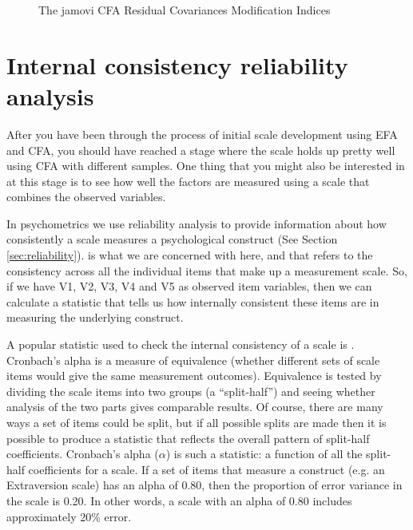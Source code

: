 \begin{figure}[p]
\begin{center}
\caption{The jamovi CFA Residual Covariances Modification Indices}
\label{fig:MTMM9}
\HR
\end{center}
\end{figure}


\section{Internal consistency reliability analysis~\label{sec:rel}}

After you have been through the process of initial scale development using EFA and CFA, you should have reached a stage where the scale holds up pretty well using CFA with different samples. One thing that you might also be interested in at this stage is to see how well the factors are measured using a scale that combines the observed variables. 

In psychometrics we use reliability analysis to provide information about how consistently a scale measures a psychological construct (See Section \ref{sec:reliability}).  is what we are concerned with here, and that refers to the consistency across all the individual items that make up a measurement scale. So, if we have V1, V2, V3, V4 and V5 as observed item variables, then we can calculate a statistic that tells us how internally consistent these items are in measuring the underlying construct.

A popular statistic used to check the internal consistency of a scale is  \parencite{Cronbach1951}. Cronbach’s alpha is a measure of equivalence (whether different sets of scale items would give the same measurement outcomes). Equivalence is tested by dividing the scale items into two groups (a “split-half”) and seeing whether analysis of the two parts gives comparable results. Of course, there are many ways a set of items could be split, but if all possible splits are made then it is possible to produce a statistic that reflects the overall pattern of split-half coefficients. Cronbach’s alpha ($\alpha$) is such a statistic: a function of all the split-half coefficients for a scale. If a set of items that measure a construct (e.g. an Extraversion scale) has an alpha of 0.80, then the proportion of error variance in the scale is 0.20. In other words, a scale with an alpha of 0.80 includes approximately 20\% error.

